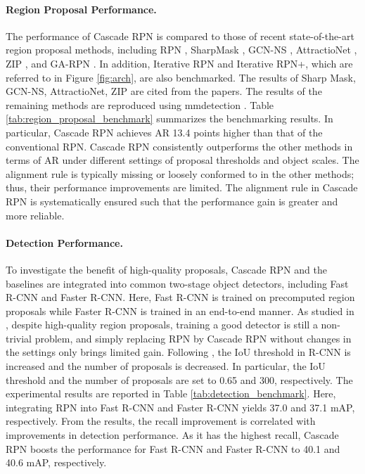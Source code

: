\documentclass{article}
\begin{document}
	\paragraph{Region Proposal Performance.}
	The performance of Cascade RPN is compared to those of recent state-of-the-art region proposal methods, including RPN \citep{NIPS2015_5638}, SharpMask \citep{pinheiro2016learning}, GCN-NS \citep{lu2018toward}, AttractioNet \citep{gidaris2016attend}, ZIP \citep{li2019zoom}, and GA-RPN \citep{wang2019region}. In addition, Iterative RPN and Iterative RPN+, which are referred to in Figure \ref{fig:arch}, are also benchmarked. The results of Sharp Mask, GCN-NS, AttractioNet, ZIP are cited from the papers. The results of the remaining methods are reproduced using mmdetection \citep{mmdetection2018}. Table \ref{tab:region_proposal_benchmark} summarizes the benchmarking results. In particular, Cascade RPN achieves AR 13.4 points higher than that of the conventional RPN. Cascade RPN consistently outperforms the other methods in terms of AR under different settings of proposal thresholds and object scales. The alignment rule is typically missing or loosely conformed to in the other methods; thus, their performance improvements are limited. The alignment rule in Cascade RPN is systematically ensured such that the performance gain is greater and more reliable. 


	
	\paragraph{Detection Performance.} To investigate the benefit of high-quality proposals, Cascade RPN and the baselines are integrated into common two-stage object detectors, including Fast R-CNN and Faster R-CNN. Here, Fast R-CNN is trained on precomputed region proposals while Faster R-CNN is trained in an end-to-end manner. As studied in \citep{wang2019region}, despite high-quality region proposals, training a good detector is still a non-trivial problem, and simply replacing RPN by Cascade RPN without changes in the settings only brings limited gain. Following \citep{wang2019region}, the IoU threshold in R-CNN is increased and the number of proposals is decreased. In particular, the IoU threshold and the number of proposals are set to 0.65 and 300, respectively. The experimental results are reported in Table \ref{tab:detection_benchmark}. Here, integrating RPN into Fast R-CNN and Faster R-CNN yields 37.0 and 37.1 mAP, respectively. 
	From the results, the recall improvement is correlated with improvements in detection performance. As it has the highest recall, Cascade RPN boosts the performance for Fast R-CNN and Faster R-CNN to 40.1 and 40.6 mAP, respectively. 
	
\end{document}

